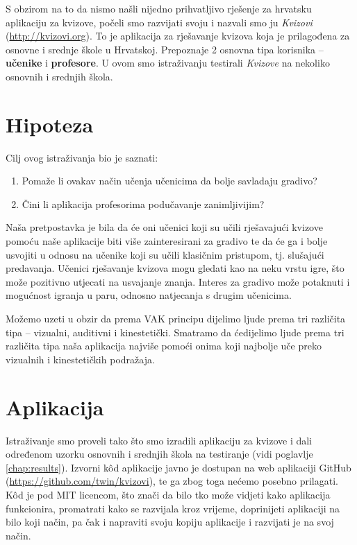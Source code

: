 \documentclass[11pt]{scrreprt}
\begin{document}
S obzirom na to da nismo našli nijedno prihvatljivo rješenje za hrvatsku
aplikaciju za kvizove, počeli smo razvijati svoju i nazvali smo ju
\emph{Kvizovi} (\url{http://kvizovi.org}). To je aplikacija za rješavanje
kvizova koja je prilagođena za osnovne i srednje škole u Hrvatskoj. Prepoznaje
2 osnovna tipa korisnika -- \textbf{učenike} i \textbf{profesore}. U ovom smo
istraživanju testirali \emph{Kvizove} na nekoliko osnovnih i srednjih škola.

\chapter{Hipoteza}

Cilj ovog istraživanja bio je saznati:

\begin{enumerate}
  \item Pomaže li ovakav način učenja učenicima da bolje savladaju gradivo?
  \item Čini li aplikacija profesorima podučavanje zanimljivijim?
\end{enumerate}

Naša pretpostavka je bila da će oni učenici koji su učili rješavajući kvizove
pomoću naše aplikacije biti više zainteresirani za gradivo te da će ga i bolje
usvojiti u odnosu na učenike koji su učili klasičnim pristupom, tj. slušajući
predavanja. Učenici rješavanje kvizova mogu gledati kao na neku vrstu igre, što
može pozitivno utjecati na usvajanje znanja. Interes za gradivo može potaknuti
i mogućnost igranja u paru, odnosno natjecanja s drugim učenicima.

Možemo uzeti u obzir da prema VAK principu dijelimo ljude prema tri različita
tipa -- vizualni, auditivni i kinestetički.\cite{clark11} Smatramo da
ćedijelimo ljude prema tri različita tipa naša aplikacija najviše pomoći onima
koji najbolje uče preko vizualnih i kinestetičkih podražaja.

\chapter{Aplikacija}

Istraživanje smo proveli tako što smo izradili aplikaciju za kvizove i dali
određenom uzorku osnovnih i srednjih škola na testiranje (vidi poglavlje
\ref{chap:results}). Izvorni kôd aplikacije javno je dostupan na web aplikaciji
GitHub (\url{https://github.com/twin/kvizovi}), te ga zbog toga nećemo posebno
prilagati. Kôd je pod MIT licencom, što znači da bilo tko može vidjeti kako
aplikacija funkcionira, promatrati kako se razvijala kroz vrijeme, doprinijeti
aplikaciji na bilo koji način, pa čak i napraviti svoju kopiju aplikacije i
razvijati je na svoj način.\cite{mit}
\end{document}
